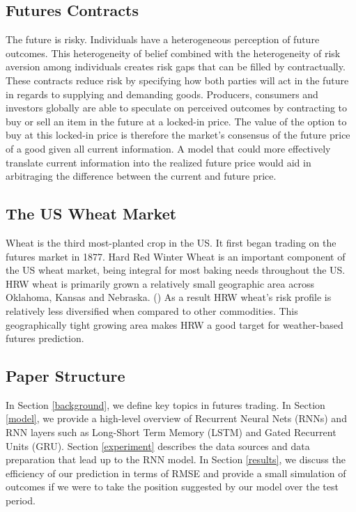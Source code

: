 \documentclass[twoside,11pt]{article}
\begin{document}
\subsection{Futures Contracts}
The future is risky. Individuals have a heterogeneous perception of future outcomes. This heterogeneity of belief combined with the heterogeneity of risk aversion among individuals creates risk gaps that can be filled by contractually. These contracts reduce risk by specifying how both parties will act in the future in regards to supplying and demanding goods. Producers, consumers and investors globally are able to speculate on perceived outcomes by contracting to buy or sell an item in the future at a locked-in price. The value of the option to buy at this locked-in price is therefore the market's consensus of the future price of a good given all current information. A model that could more effectively translate current information into the realized future price would aid in arbitraging the difference between the current and future price.

\subsection{The US Wheat Market}
Wheat is the third most-planted crop in the US. It first began trading on the futures market in 1877. Hard Red Winter Wheat is an important component of the US wheat market, being integral for most baking needs throughout the US. HRW wheat is primarily grown a relatively small geographic area across Oklahoma, Kansas and Nebraska. (\cite{CME}) As a result HRW wheat's risk profile is relatively less diversified when compared to other commodities. This geographically tight growing area makes HRW a good target for weather-based futures prediction. 

\subsection{Paper Structure}
In Section \ref{background}, we define key topics in futures trading. In Section \ref{model}, we provide a high-level overview of Recurrent Neural Nets (RNNs) and RNN layers such as Long-Short Term Memory (LSTM) and Gated Recurrent Units (GRU). Section \ref{experiment} describes the data sources and data preparation that lead up to the RNN model.  In Section \ref{results}, we discuss the efficiency of our prediction in terms of RMSE and provide a small simulation of outcomes if we were to take the position suggested by our model over the test period. 
\end{document}
